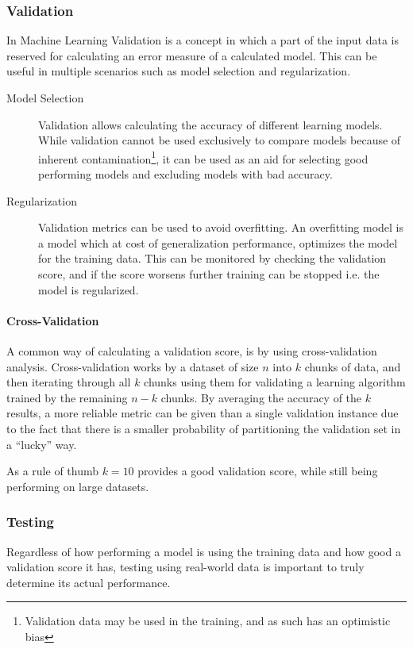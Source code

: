 \subsubsection{Validation}
\label{ssub:Validation}
In Machine Learning Validation is a concept in which a part of the input data is reserved for calculating an error measure of a calculated model.
This can be useful in multiple scenarios such as  model selection and regularization.
\begin{description}
  \item[Model Selection] Validation allows calculating the accuracy of different learning models.
    While validation cannot be used exclusively to compare models because of inherent contamination\footnote{Validation data may be used in the training, and as such has an optimistic bias\cite{learningfromdata2012book}},
    it can be used as an aid for selecting good performing models and excluding models with bad accuracy.
  \item[Regularization] Validation metrics can be used to avoid overfitting.
    An overfitting model is a model which at cost of generalization performance, optimizes the model for the training data.
    This can be monitored by checking the validation score, and if the score worsens further training can be stopped i.e. the model is regularized.
\end{description}
\paragraph{Cross-Validation}
\label{par:Cross-Validation}
A common way of calculating a validation score, is by using cross-validation analysis. Cross-validation works by a dataset of size $n$ into $k$ chunks of data, and then
iterating through all $k$ chunks using them for validating a learning algorithm trained by the remaining $n-k$ chunks. 
By averaging the accuracy of the $k$ results, a more reliable metric can be given than a single validation instance due to the fact that there is a smaller probability of
partitioning the validation set in a ``lucky'' way.

As a rule of thumb $k=10$ provides a good validation score, while still being performing on large datasets\cite{learningfromdata2012course}.

\subsubsection{Testing}
\label{ssub:Testing}
Regardless of how performing a model is using the training data and how good a validation score it has,
testing using real-world data is important to truly determine its actual performance.

